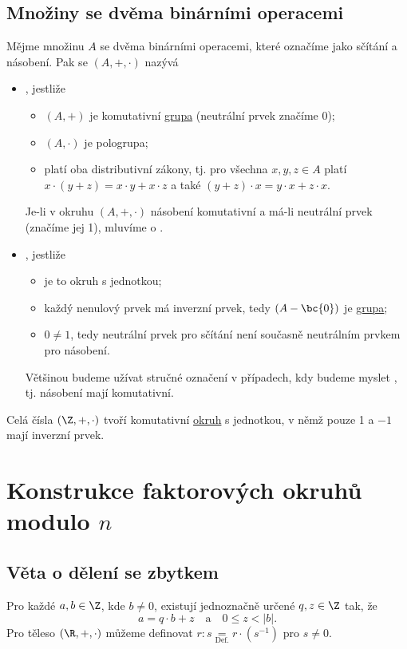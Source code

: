 \subsection{Množiny se dvěma binárními operacemi}
Mějme množinu $A$ se dvěma binárními operacemi, které označíme jako sčítání a násobení. Pak se $(A, +, \cdot)$ nazývá 
\begin{itemize}
	\item {}, jestliže
		\begin{itemize}
			\item $(A, +)$ je komutativní \hyperref[grupa]{grupa} (neutrální prvek značíme 0);
			\item $(A, \cdot)$ je pologrupa;
			\item platí oba distributivní zákony, tj. pro všechna $x, y, z \in A$ platí $x \cdot (y + z) = x \cdot y + x \cdot z$ a také $(y + z) \cdot x = y \cdot x + z \cdot x$.
		\end{itemize}\label{okruh}
		Je-li v okruhu $(A, +, \cdot)$ násobení komutativní a má-li neutrální prvek (značíme jej 1), mluvíme o .
	\item {}, jestliže
		\begin{itemize}
			\item je to okruh s jednotkou;
			\item každý nenulový prvek má inverzní prvek, tedy $(A - \bc{0})$ je \hyperref[grupa]{grupa};
			\item $0 \not= 1$, tedy neutrální prvek pro sčítání není současně neutrálním prvkem pro násobení.
		\end{itemize}\label{teleso}
		Většinou budeme užívat stručné označení  v případech, kdy budeme myslet , tj. násobení mají komutativní.
\end{itemize}
Celá čísla $(\Z, +, \cdot)$ tvoří komutativní \hyperref[okruh]{okruh} s jednotkou, v němž pouze 1 a $-1$ mají inverzní prvek.

\section*{Konstrukce faktorových okruhů modulo \texorpdfstring{$n$}{n}}
\subsection{Věta o dělení se zbytkem}\label{delZbyt}%
Pro každé $a, b \in \Z$, kde $b \not= 0$, existují jednoznačně určené $q, z \in \Z$ tak, že
\begin{equation}
	a = q \cdot b + z \quad \text{a} \quad 0 \leq z < |b|.
\end{equation}
Pro těleso $(\R, +, \cdot)$ můžeme definovat $r : s \underset{\text{Def.}}{=} r \cdot (s^{-1})$ pro $s \not= 0$.

